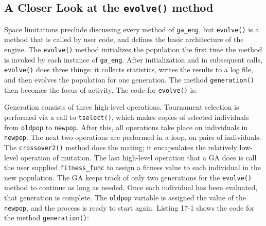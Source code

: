 \subsection*{A Closer Look at the \texttt{evolve()} method}

Space limitations preclude discussing every method of
\texttt{ga\_eng}, but \texttt{evolve()} is a method that is called
by user code, and defines the basic architecture of the
engine. The \texttt{evolve()} method initializes the population the
first time the method is invoked by each instance of \texttt{ga\_eng}.
After initialization and in subsequent calls, \texttt{evolve()}
does three things: it collects statistics, writes the results to a log
file, and then evolves the population for one generation. The method
\texttt{generation()} then becomes the focus of activity. The code for
\texttt{evolve()} is:


Generation consists of three high-level operations. Tournament
selection is performed via a call to \texttt{tselect()}, which makes
copies of selected individuals from \texttt{oldpop} to
\texttt{newpop}.
After this, all operations take place on individuals in
\texttt{newpop}. The next two operations are performed in a
loop, on pairs of individuals. The \texttt{crossover2()} method does
the mating; it encapsulates the relatively low-level operation of
mutation. The last high-level operation that a GA does is call the user
supplied \texttt{fitness\_func} to assign a fitness value to each
individual in the new population. The GA keeps track of only two
generations for the \texttt{evolve()} method to continue as long as
needed. Once each individual has been evaluated, that generation is
complete. The \texttt{oldpop} variable is assigned the value of the
\texttt{newpop}, and the process is ready to start again. Listing 17-1
shows the code for the method \texttt{generation()}:

